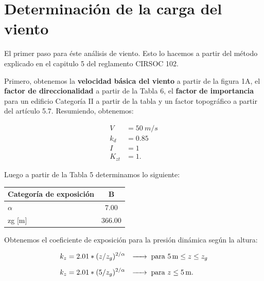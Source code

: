 \documentclass[../main.tex]{subfiles}
\begin{document}
\section{Determinación de la carga del viento}

El primer paso para éste análisis de viento. Esto lo hacemos a partir del método
explicado en el capitulo 5 del reglamento CIRSOC 102. 

Primero, obtenemos la \textbf{velocidad básica del viento} a partir de la figura
1A, el \textbf{factor de direccionalidad} a partir de la Tabla 6, el \textbf{factor}
\textbf{de importancia} para un edificio Categoría II a partir de la tabla y 
un factor topográfico a partir del artículo 5.7. 
Resumiendo, obtenemos:

\begin{align*}
  V &= \SI{50}{m / s} \\[5pt]
  k_d &= 0.85 \\[5pt]
  I &= 1 \\[5pt]
  K_{zt} &= 1
.\end{align*}

Luego a partir de la Tabla 5 determinamos lo siguiente:

\begin{table}[htbp]
  \centering
    \begin{tabular}{|l|c|}
    \hline
    Categoría de exposición & B \bigstrut\\
    \hline
    $\alpha$     & 7.00 \bigstrut\\
    \hline
    zg [m] & 366.00 \bigstrut\\
    \hline
    \end{tabular}%
  \label{tab:addlabel}%
\end{table}%

Obtenemos el coeficiente de exposición para la presión dinámica según la altura:

\begin{align*}
  k_z &= 2.01 * ( z / z_g)^{2 / \alpha} \hspace{0.25cm} \xrightarrow{\hspace*{0.5cm}} \hspace{0.1cm} \text{para } \SI{5}{m}\leq z\leq z_g \\[5pt]
  k_z &= 2.01 * (5 / z_g)^{2 / \alpha} \hspace{0.25cm} \xrightarrow{\hspace*{0.5cm}} \hspace{0.1cm} \text{para } z \leq \SI{5}{m}
.\end{align*}
\end{document}
